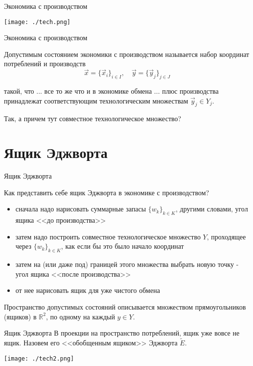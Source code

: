 \documentclass{beamer}
\begin{document}
\begin{frame}{Экономика с производством}
\begin{center}
     \texttt{[image: ./tech.png]}
     \end{center}

\end{frame}

\begin{frame}{Экономика с производством}

\alert{Допустимым состоянием} экономики с производством называется набор координат потреблений и производств
$$\vec x = \{\vec x_i\}_{i \in I}, \quad \vec y = \{ \vec y_j\}_{j \in J}$$

такой, что ... все то же что и в экономике обмена ... плюс производства принадлежат соответствующим технологическим множествам $\vec y_j \in Y_j.$

Так, а причем тут совместное технологическое множество?

\end{frame}

\section{Ящик Эджворта}

\begin{frame}{Ящик Эджворта}

Как представить себе ящик Эджворта в экономике с производством?

\begin{itemize}
  \item сначала надо нарисовать суммарные запасы $\{w_k\}_{k \in K}$, другими словами, угол ящика <<до производства>>
  \item затем надо построить совместное технологическое множество $Y$, проходящее через $\{w_k\}_{k \in K}$, как если бы это было начало координат
  \item затем на (или даже под) границей этого множества выбрать новую точку - угол ящика <<после производства>>
  \item от нее нарисовать ящик для уже чистого обмена
\end{itemize}

Пространство допустимых состояний описывается множеством прямоугольников (ящиков) в $\mathbb{R}^2$, по одному на каждый $y \in Y$.

\end{frame}

\begin{frame}{Ящик Эджворта}
В проекции на пространство потреблений, ящик уже вовсе не ящик. Назовем его <<обобщенным ящиком>> Эджворта $\tilde E$. 
\begin{center}
     \texttt{[image: ./tech2.png]}
     \end{center}

\end{frame}
\end{document}

